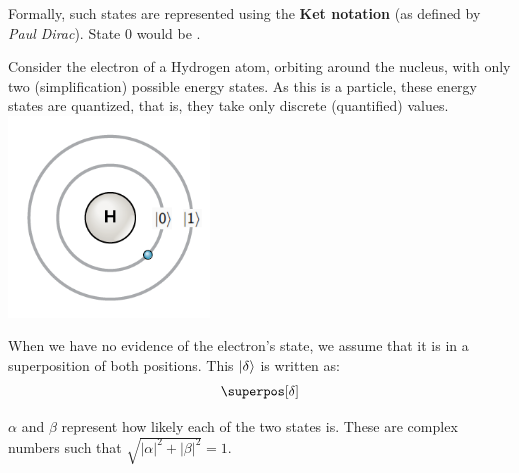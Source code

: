\documentclass[aspectratio=43]{beamer}
\begin{document}
\begin{frame}{\qsp}
    \begin{cardTiny}
        Formally, such states are represented using the \textbf{Ket notation} (as defined by \textit{Paul Dirac}). State 0 would be .
    \end{cardTiny}
    \begin{cardTiny}
        \begin{multicols}{2}
    		Consider the electron of a Hydrogen atom, orbiting around the nucleus, with only two (simplification) possible energy states. As this is a \q particle, these energy states are quantized, that is, they take only discrete (quantified) values.
    		\centering
    		\includegraphics[width=0.4\textwidth]{hydrogen}
	    \end{multicols}
    \end{cardTiny}
\pagenumber
\end{frame}

\begin{frame}{\qsp}
    \begin{card}
        When we have no evidence of the electron's state, we assume that it is in a superposition of both positions. This \qsp $\ket{\delta}$ is written as:
	\begin{equation*}
	    \superpos[\delta]
	\end{equation*}
    \end{card}
    \begin{cardTiny}
        $\alpha$ and $\beta$ represent how likely each of the two states is. These are complex numbers such that $\sqrt{|\alpha|^2 + |\beta|^2} = 1$.
    \end{cardTiny}
\pagenumber
\end{frame}
\end{document}
